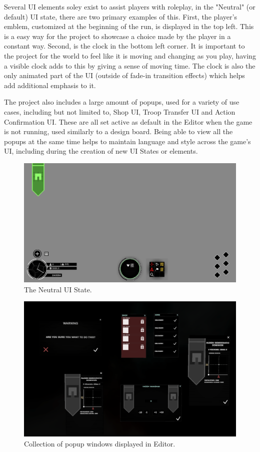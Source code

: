 \documentclass{report}
\begin{document}
Several UI elements soley exist to assist players with roleplay, in the "Neutral" (or default) UI state, there are two primary examples of this. First, the player's emblem, customized at the beginning of the run, is displayed in the top left. This is a easy way for the project to showcase a choice made by the player in a constant way. Second, is the clock in the bottom left corner. It is important to the project for the world to feel like it is moving and changing as you play, having a visible clock adds to this by giving a sense of moving time. The clock is also the only animated part of the UI (outside of fade-in transition effects) which helps add additional emphasis to it.

The project also includes a large amount of popups, used for a variety of use cases, including but not limited to, Shop UI, Troop Transfer UI and Action Confirmation UI. These are all set active as default in the Editor when the game is not running, used similarly to a design board. Being able to view all the popups at the same time helps to maintain language and style across the game's UI, including during the creation of new UI States or elements.

\begin{figure}[H]
	\centering
    \includegraphics[width=.9\textwidth]{UIExample1.png}
    \caption{The Neutral UI State.}
\end{figure}

\begin{figure}[H]
	\centering
    \includegraphics[width=.9\textwidth]{UIExample2.png}
    \caption{Collection of popup windows displayed in Editor.}
\end{figure}
\end{document}
